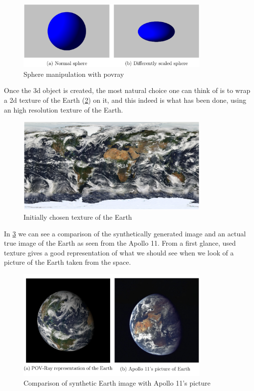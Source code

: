 \begin{figure}[htbp]
  \centering
  \includegraphics[width=0.85\textwidth]{gfx/sphere_scaling.eps}
  \caption{Sphere manipulation with \acrshort{povray} \cite{jacopo}}
  \label{fig:spherescaling}
\end{figure}

Once the \acrshort{3d} object is created, the most natural choice one can think of is to wrap a \acrshort{2d} texture of the Earth (\ref{fig:firstTexture}) on it, and this indeed is what has been done, using an high resolution texture of the Earth.

\begin{figure}[htbp]
  \centering
  \includegraphics[width=0.85\textwidth]{gfx/first_text.eps}
  \caption{Initially chosen texture of the Earth}
  \label{fig:firstTexture}
\end{figure}

\bigskip

In \ref{fig:EarthApollo} we can see a comparison of the synthetically generated image and an actual true image of the Earth as seen from the Apollo 11. From a first glance, used texture gives a good representation of what we should see when we look of a picture of the Earth taken from the space.

\begin{figure}[htbp]
  \centering
  \includegraphics[width=0.85\textwidth]{gfx/earthApolloOurs.eps}
  \caption{Comparison of synthetic Earth image with Apollo 11's picture}
  \label{fig:EarthApollo}
\end{figure}

